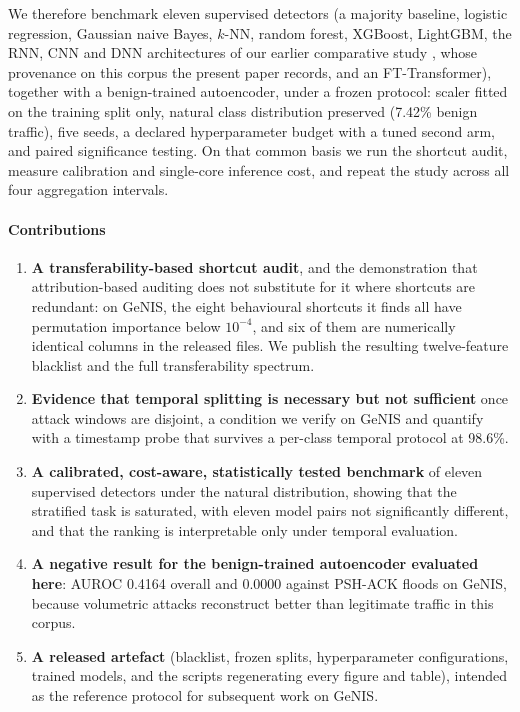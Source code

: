 \documentclass[review,12pt]{elsarticle}
\begin{document}
We therefore benchmark eleven supervised detectors (a majority baseline, logistic
regression, Gaussian naive Bayes, $k$-NN, random forest, XGBoost, LightGBM, the RNN, CNN
and DNN architectures of our earlier comparative study \cite{bahri2023comparative}, whose
provenance on this corpus the present paper records, and an FT-Transformer),
together with a benign-trained autoencoder, under a frozen protocol: scaler fitted on
the training split only, natural class distribution preserved (7.42\% benign traffic),
five seeds, a declared hyperparameter budget with a tuned second arm, and paired
significance testing. On that common basis we run the shortcut audit, measure calibration and
single-core inference cost, and repeat the study across all four aggregation intervals.

\paragraph{Contributions}
\begin{enumerate}
  \item \textbf{A transferability-based shortcut audit}, and the demonstration that
  attribution-based auditing does not substitute for it where shortcuts are redundant:
  on GeNIS, the eight behavioural shortcuts it finds all have permutation importance
  below $10^{-4}$, and six of them are numerically identical columns in the released
  files. We publish the resulting twelve-feature blacklist and the full transferability
  spectrum.
  \item \textbf{Evidence that temporal splitting is necessary but not sufficient} once
  attack windows are disjoint, a condition we verify on GeNIS and quantify with a
  timestamp probe that survives a per-class temporal protocol at 98.6\%.
  \item \textbf{A calibrated, cost-aware, statistically tested benchmark} of eleven
  supervised detectors under the natural distribution, showing that the stratified task
  is saturated, with eleven model pairs not significantly different, and that the ranking
  is interpretable only under temporal evaluation.
  \item \textbf{A negative result for the benign-trained autoencoder evaluated here}:
  AUROC 0.4164 overall and 0.0000 against PSH-ACK floods on GeNIS, because volumetric
  attacks reconstruct better than legitimate traffic in this corpus.
  \item \textbf{A released artefact} (blacklist, frozen splits, hyperparameter
  configurations, trained models, and the scripts regenerating every figure and table),
  intended as the reference protocol for subsequent work on GeNIS.
\end{enumerate}
\end{document}
